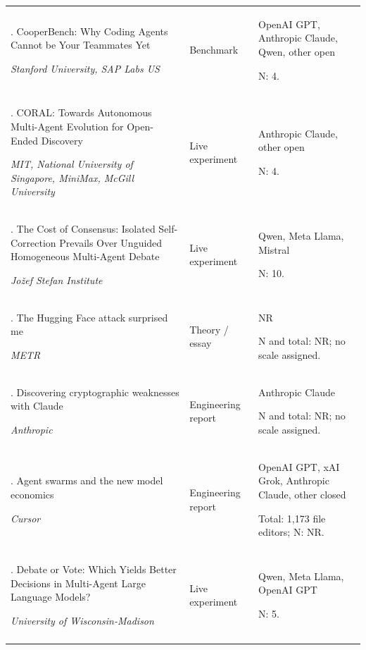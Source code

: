 \begin{longtable}{@{}>{\raggedright\arraybackslash}p{}>{\raggedright\arraybackslash}p{}>{\raggedright\arraybackslash}p{}@{}}
59. CooperBench: Why Coding Agents Cannot be Your Teammates Yet \citep{cooperbench}\par\emph{Stanford University, SAP Labs US} & Benchmark & OpenAI GPT, Anthropic Claude, Qwen, other open\par N: 4. \\ \addlinespace[2pt]
60. CORAL: Towards Autonomous Multi-Agent Evolution for Open-Ended Discovery \citep{coral}\par\emph{MIT, National University of Singapore, MiniMax, McGill University} & Live experiment & Anthropic Claude, other open\par N: 4. \\ \addlinespace[2pt]
61. The Cost of Consensus: Isolated Self-Correction Prevails Over Unguided Homogeneous Multi-Agent Debate \citep{cost-of-consensus}\par\emph{Jožef Stefan Institute} & Live experiment & Qwen, Meta Llama, Mistral\par N: 10. \\ \addlinespace[2pt]
62. The Hugging Face attack surprised me \citep{cotra-surprised}\par\emph{METR} & Theory / essay & NR\par N and total: NR; no scale assigned. \\ \addlinespace[2pt]
63. Discovering cryptographic weaknesses with Claude \citep{crypto-weaknesses}\par\emph{Anthropic} & Engineering report & Anthropic Claude\par N and total: NR; no scale assigned. \\ \addlinespace[2pt]
64. Agent swarms and the new model economics \citep{cursor-swarm-economics}\par\emph{Cursor} & Engineering report & OpenAI GPT, xAI Grok, Anthropic Claude, other closed\par Total: 1,173 file editors; N: NR. \\ \addlinespace[2pt]
65. Debate or Vote: Which Yields Better Decisions in Multi-Agent Large Language Models? \citep{debate-or-vote}\par\emph{University of Wisconsin-Madison} & Live experiment & Qwen, Meta Llama, OpenAI GPT\par N: 5. \\ \addlinespace[2pt]

\end{longtable}
